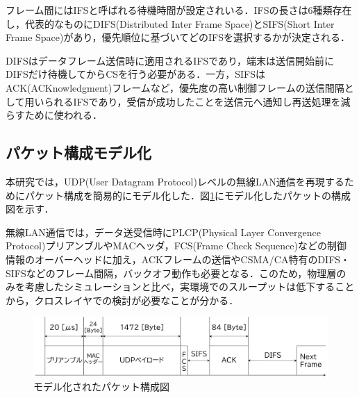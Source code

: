 \documentclass[a4paper, 10pt]{ltjsarticle}
\begin{document}
フレーム間にはIFSと呼ばれる待機時間が設定されいる．IFSの長さは6種類存在し，代表的なものにDIFS(Distributed Inter Frame Space)とSIFS(Short Inter Frame Space)があり，優先順位に基づいてどのIFSを選択するかが決定される．

DIFSはデータフレーム送信時に適用されるIFSであり，端末は送信開始前にDIFSだけ待機してからCSを行う必要がある．一方，SIFSはACK(ACKnowledgment)フレームなど，優先度の高い制御フレームの送信間隔として用いられるIFSであり，受信が成功したことを送信元へ通知し再送処理を減らすために使われる．



\subsection{パケット構成モデル化}

本研究では，UDP(User Datagram Protocol)レベルの無線LAN通信を再現するためにパケット構成を簡易的にモデル化した．図\ref{packet}にモデル化したパケットの構成図を示す．


無線LAN通信では，データ送受信時にPLCP(Physical
Layer Convergence Protocol)プリアンブルやMACヘッダ，FCS(Frame Check Sequence)などの制御情報のオーバーヘッドに加え，ACKフレームの送信やCSMA/CA特有のDIFS・SIFSなどのフレーム間隔，バックオフ動作も必要となる．このため，物理層のみを考慮したシミュレーションと比べ，実環境でのスループットは低下することから，クロスレイヤでの検討が必要なことが分かる．

\begin{figure}[htbp]
  \centering
  \includegraphics[width=1\columnwidth]{./assets/packet.png}
  \caption{モデル化されたパケット構成図}
  \label{packet}
\end{figure}

\end{document}
